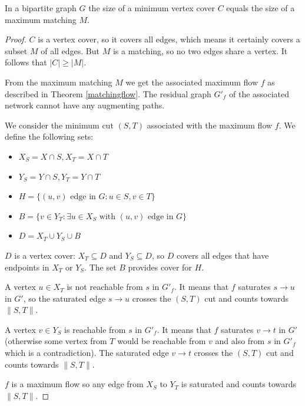 \begin{thm}\label{koenig}
In a bipartite graph $G$ the size of a minimum vertex cover $C$ equals the size of a maximum matching $M$. 
\end{thm}

\begin{proof}

$C$ is a vertex cover, so it covers all edges, which means it certainly covers a subset $M$ of all edges. But $M$ is a matching, so no two edges share a vertex. It follows that $|C| \geq |M|$.

From the maximum matching $M$ we get the associated maximum flow $f$ as described in Theorem \ref{matchingflow}. The residual graph $G'_f$ of the associated network cannot have any augmenting paths. 

We consider the minimum cut $(S, T)$ associated with the maximum flow $f$. We define the following sets:

\begin{itemize}
	\item $X_S = X \cap S, X_T = X \cap T$
	\item $Y_S = Y \cap S, Y_T = Y \cap T$
	\item $H = \{(u, v) \text{ edge in } G: u \in S, v \in T\}$
	\item $B = \{v \in Y_T: \exists u \in X_S \text{ with } (u, v) \text{ edge in } G\}$
	\item $D = X_T \cup Y_S \cup B$
\end{itemize}	

\noindent $D$ is a vertex cover: $X_T \subseteq D$ and $Y_S \subseteq D$, so $D$ covers all edges that have endpoints in $X_T$ or $Y_S$. The set $B$ provides cover for $H$. 

A vertex $u \in X_T$ is not reachable from $s$ in $G'_f$. It means that $f$ saturates $s \rightarrow u$ in $G'$, so the saturated edge $s \rightarrow u$ crosses the $(S, T)$ cut and counts towards $\|S, T\|$.

A vertex $v \in Y_S$ is reachable from $s$ in $G'_f$. It means that $f$ saturates $v \rightarrow t$ in $G'$ (otherwise some vertex from $T$ would be reachable from $v$ and also from $s$ in $G'_f$ which is a contradiction). The saturated edge $v \rightarrow t$ crosses the $(S, T)$ cut and counts towards $\|S, T\|$.

$f$ is a maximum flow so any edge from $X_S$ to $Y_T$ is saturated and counts towards $\|S, T\|$.


\end{proof}
